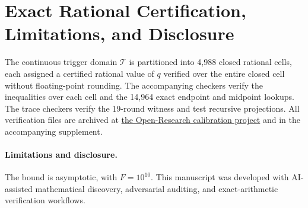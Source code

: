 \documentclass[11pt,letterpaper]{article}
\theoremstyle{definition}
\theoremstyle{remark}
\begin{document}
\section{Exact Rational Certification, Limitations, and Disclosure}
The continuous trigger domain $\mathcal{T}$ is partitioned into 4,988 closed rational cells, each assigned a certified rational value of $q$ verified over the entire closed cell without floating-point rounding. The accompanying checkers verify the inequalities over each cell and the 14,964 exact endpoint and midpoint lookups. The trace checkers verify the 19-round witness and test recursive projections.
All verification files are archived at \href{https://github.com/Rtx09x/Open-Research/tree/main/computer-science/sequential-calibration}{the Open-Research calibration project} and in the accompanying supplement.

\paragraph{Limitations and disclosure.}
The bound is asymptotic, with $F=10^{10}$. This manuscript was developed with AI-assisted mathematical discovery, adversarial auditing, and exact-arithmetic verification workflows.



\end{document}

